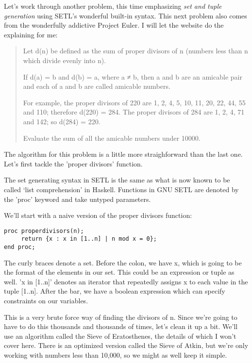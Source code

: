 \documentclass[11pt]{article}
\begin{document}
Let's work through another problem, this time emphasizing \textit{set
  and tuple generation} using SETL's wonderful built-in syntax. This
next problem also comes from the wonderfully addictive Project
Euler. I will let the website do the explaining for me:

\begin{quote}
Let d(n) be defined as the sum of proper divisors of n (numbers less
than n which divide evenly into n).

If d(a) = b and d(b) = a, where a ≠ b, then a and b are an amicable
pair and each of a and b are called amicable numbers.

For example, the proper divisors of 220 are 1, 2, 4, 5, 10, 11, 20,
22, 44, 55 and 110; therefore d(220) = 284. The proper divisors of 284
are 1, 2, 4, 71 and 142; so d(284) = 220.

Evaluate the sum of all the amicable numbers under 10000.
\end{quote}

The algorithm for this problem is a little more straighforward than the
last one. Let's first tackle the 'proper divisors' function.

The set generating syntax in SETL is the same as what is now known to
be called `list comprehension' in Haskell. Functions in GNU SETL are
denoted by the 'proc' keyword and take untyped parameters.

We'll start with a naive version of the proper divisors function:

\begin{verbatim}
proc properdivisors(n);
     return {x : x in [1..n] | n mod x = 0};
end proc;
\end{verbatim}

The curly braces denote a set. Before the colon, we have x, which is
going to be the format of the elements in our set. This could be an
expression or tuple as well. 'x in [1..n]' denotes an iterator that
repeatedly assigns x to each value in the tuple [1..n]. After the bar,
we have a boolean expression which can specify constraints on our
variables. 

This is a very brute force way of finding the divisors of n. Since
we're going to have to do this thousands and thousands of times, let's
clean it up a bit. We'll use an algorithm called the Sieve of
Eratosthenes, the details of which I won't cover here. There is an
optimized version called the Sieve of Atkin, but we're only working
with numbers less than 10,000, so we might as well keep it simple.
\end{document}
